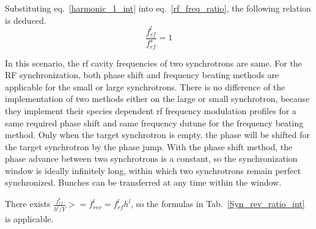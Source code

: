 Substituting eq.~\ref{harmonic_1_int} into eq.~\ref{rf_freq_ratio}, the following relation is deduced. 
\begin{equation} 
\frac{f_{rf}^{l}}{f_{rf}^{s}}= 1\label{frequency_same}
\end{equation}

In this scenario, the rf cavity frequencies of two synchrotrons are same. For the RF synchronization, both phase shift and frequency beating methods are applicable for the small or large synchrotrons. There is no difference of the implementation of two methods either on the large or small synchrotron, because they implement their species dependent rf frequency modulation profiles for a same required phase shift and same frequency dutune for the frequency beating method. Only when the target synchrotron is empty, the phase will be shifted for the target synchrotron by the phase jump. With the phase shift method, the phase advance between two synchrotrons is a constant, so the synchronization window is ideally infinitely long, within which two synchrotrons remain perfect synchronized. Bunches can be transferred at any time within the window.

There exists $\frac{f_{rf}^{l}}{h^l/Y}>=f_{rev}^{l}={f_{rf}^{l}}{h^l}$, so the formulas in Tab.~\ref{Syn_rev_ratio_int} is applicable.

